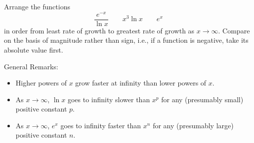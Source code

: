 \documentclass{ximera}
\begin{document}
\begin{question}%

Arrange the functions 
\[ \frac{e^{- x}}{\ln{x}} \qquad x^{3} \ln{x} \qquad e^{x} \]
in order from least rate of growth to greatest rate of growth as \(x \rightarrow \infty\). Compare on the basis of magnitude rather than sign, i.e., if a function is negative, take its absolute value first.
\begin{multiplechoice}
\end{multiplechoice}
\begin{feedback}
General Remarks:
\begin{itemize} \item Higher powers of \(x\) grow faster at infinity than lower powers of \(x\).
\item As \(x \rightarrow \infty\), \(\ln x\) goes to infinity slower than \(x^p\) for any (presumably small) positive constant \(p\).
\item As \(x \rightarrow \infty\), \(e^x\) goes to infinity faster than \(x^n\) for any (presumably large) positive constant \(n\).
\end{itemize}
\end{feedback}

\end{question}
\end{document}
